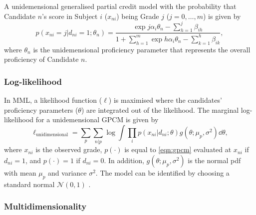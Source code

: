 A unidemensional generalised partial credit model \parencite{muraki:1992} with the probability that Candidate $n$'s score in Subject $i$ ($x_{ni}$) being Grade $j$ ($j=0, \dots, m$) is given by
\begin{equation}\label{eqn:gpcm}
    p \left( x_{ni}=j | d_{ni} = 1; \theta_n \right) = \frac{\exp{j \alpha_i \theta_n - \sum_{h=1}^j \beta_{ih}} }{ 1 + \sum_{h=1}^m \exp{h \alpha_i \theta_n - \sum_{k=1}^h \beta_{ik}} },
\end{equation}
where $\theta_n$ is the unidemensional proficiency parameter that represents the overall proficiency of Candidate $n$.

\subsubsection{Log-likelihood}

In MML, a likelihood function ($\ell$) is maximised where the candidates' proficiency parameters ($\theta$) are integrated out of the likelihood. The marginal log-likelihood for a unidemensional GPCM is given by
\begin{equation}\label{eqn:ll}
    \ell_\text{unidimensional} = \sum_p \sum_{n | p} \log \int \prod_i p( x_{ni} | d_{ni}; \theta ) g(\theta; \mu_p, \sigma^2) \dd \theta,
\end{equation}
where $x_{ni}$ is the observed grade, $p( \cdot )$ is equal to \cref{eqn:gpcm} evaluated at $x_{ni}$ if $d_{ni}=1$, and $p( \cdot ) = 1$ if $d_{ni} = 0$. In addition, $g(\theta; \mu_p, \sigma^2)$ is the normal pdf with mean $\mu_p$ and variance $\sigma^2$. The model can be identified by choosing a standard normal $\mathcal{N}(0,1)$ \parencite{korobko:2008}.

\subsubsection{Multidimensionality}

